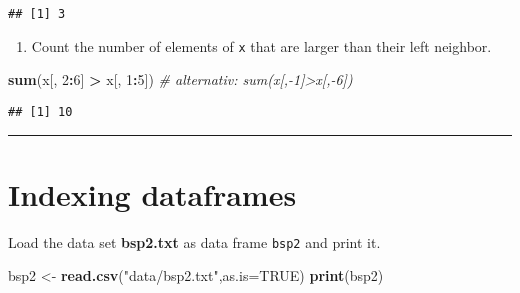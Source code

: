 \documentclass[]{article}
\newenvironment{Shaded}{\begin{snugshade}}{\end{snugshade}}
\newcommand{\KeywordTok}[1]{\textcolor[rgb]{0.13,0.29,0.53}{\textbf{#1}}}
\newcommand{\DataTypeTok}[1]{\textcolor[rgb]{0.13,0.29,0.53}{#1}}
\newcommand{\DecValTok}[1]{\textcolor[rgb]{0.00,0.00,0.81}{#1}}
\newcommand{\StringTok}[1]{\textcolor[rgb]{0.31,0.60,0.02}{#1}}
\newcommand{\CommentTok}[1]{\textcolor[rgb]{0.56,0.35,0.01}{\textit{#1}}}
\newcommand{\OtherTok}[1]{\textcolor[rgb]{0.56,0.35,0.01}{#1}}
\newcommand{\OperatorTok}[1]{\textcolor[rgb]{0.81,0.36,0.00}{\textbf{#1}}}
\newcommand{\NormalTok}[1]{#1}
\providecommand{\tightlist}{%
  \setlength{\itemsep}{0pt}\setlength{\parskip}{0pt}}
\begin{document}
\begin{verbatim}
## [1] 3
\end{verbatim}

\begin{enumerate}
\def\labelenumi{\arabic{enumi}.}
\setcounter{enumi}{5}
\tightlist
\item
  Count the number of elements of \texttt{x} that are larger than their
  left neighbor.
\end{enumerate}

\begin{Shaded}
\begin{Highlighting}[]
\KeywordTok{sum}\NormalTok{(x[, }\DecValTok{2}\OperatorTok{:}\DecValTok{6}\NormalTok{] }\OperatorTok{>}\StringTok{ }\NormalTok{x[, }\DecValTok{1}\OperatorTok{:}\DecValTok{5}\NormalTok{])  }\CommentTok{# alternativ: sum(x[,-1]>x[,-6])}
\end{Highlighting}
\end{Shaded}

\begin{verbatim}
## [1] 10
\end{verbatim}

\begin{center}\rule{0.5\linewidth}{\linethickness}\end{center}

\section{Indexing dataframes}\label{indexing-dataframes}

Load the data set \textbf{bsp2.txt} as data frame \texttt{bsp2} and
print it.

\begin{Shaded}
\begin{Highlighting}[]
\NormalTok{bsp2 <-}\StringTok{ }\KeywordTok{read.csv}\NormalTok{(}\StringTok{"data/bsp2.txt"}\NormalTok{,}\DataTypeTok{as.is=}\OtherTok{TRUE}\NormalTok{)}
\KeywordTok{print}\NormalTok{(bsp2)}
\end{Highlighting}
\end{Shaded}
\end{document}
